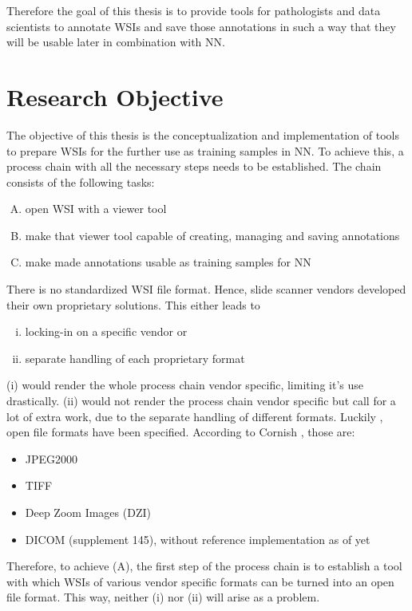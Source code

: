 Therefore the goal of this thesis is to provide tools for pathologists and data scientists to annotate WSIs and save those annotations in such a way that they will be usable later in combination with NN.


\section{Research Objective}
The objective of this thesis is the conceptualization and implementation of tools to prepare WSIs for the further use as training samples in NN. To achieve this, a process chain with all the necessary steps needs to be established. The chain consists of the following tasks:
\begin{enumerate}[(A)]
	\item open WSI with a viewer tool
	\item make that viewer tool capable of creating, managing and saving annotations
	\item make made annotations usable as training samples for NN
\end{enumerate}

There is no standardized WSI file format\cite{Cornish13}. Hence, slide scanner vendors developed their own proprietary solutions. This either leads to
\begin{enumerate}[(i)]
	\item locking-in on a specific vendor or
	\item separate handling of each proprietary format
\end{enumerate}
(i) would render the whole process chain vendor specific, limiting it's use drastically. (ii) would not render the process chain vendor specific but call for a lot of extra work, due to the separate handling of different formats. Luckily , open file formats have been specified. According to Cornish \cite{Cornish13}, those are:
\begin{itemize}
	\item JPEG2000
	\item TIFF
	\item Deep Zoom Images (DZI)
	\item DICOM (supplement 145), without reference implementation as of yet\cite{Cornish13}
\end{itemize}
Therefore, to achieve (A), the first step of the process chain is to establish a tool with which WSIs of various vendor specific formats can be turned into an open file format. This way, neither (i) nor (ii) will arise as a problem.

